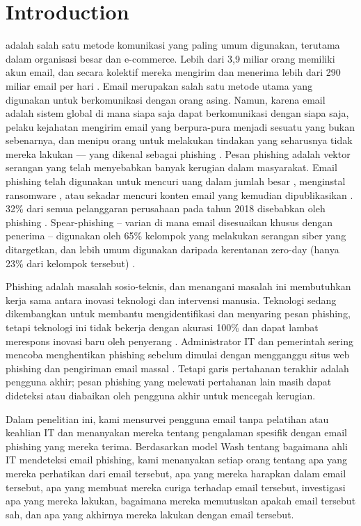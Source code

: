 \documentclass[lettersize,journal]{IEEEtran}
\begin{document}
\section{Introduction}
 adalah salah satu metode komunikasi yang paling umum 
digunakan, terutama dalam organisasi besar dan e-commerce. Lebih dari 3,9 miliar
orang memiliki akun email, dan secara kolektif mereka mengirim dan menerima
lebih dari 290 miliar email per hari \cite{sebelas}. Email merupakan salah 
satu metode utama yang digunakan untuk berkomunikasi dengan orang asing. 
Namun, karena email adalah sistem global di mana siapa saja dapat berkomunikasi 
dengan siapa saja, pelaku kejahatan mengirim email yang berpura-pura menjadi
sesuatu yang bukan sebenarnya, dan menipu orang untuk melakukan tindakan yang
seharusnya tidak mereka lakukan — yang dikenal sebagai phishing \cite{tigaempat}.
Pesan phishing adalah vektor serangan yang telah menyebabkan banyak kerugian
dalam masyarakat. Email phishing telah digunakan untuk mencuri uang dalam jumlah
besar \cite{duadua}, menginstal ransomware \cite{tigasatu}, atau sekadar mencuri
konten email yang kemudian dipublikasikan \cite{duasatu}. 32\% dari semua 
pelanggaran perusahaan pada tahun 2018 disebabkan oleh phishing \cite{tigatiga}. 
Spear-phishing – varian di mana email disesuaikan khusus dengan penerima – digunakan
oleh 65\% kelompok yang melakukan serangan siber yang ditargetkan, dan lebih umum 
digunakan daripada kerentanan zero-day (hanya 23\% dari kelompok tersebut) \cite{tigadua}.

Phishing adalah masalah sosio-teknis, dan menangani masalah ini membutuhkan
kerja sama antara inovasi teknologi dan intervensi manusia. Teknologi sedang
dikembangkan untuk membantu mengidentifikasi dan menyaring pesan phishing,
tetapi teknologi ini tidak bekerja dengan akurasi 100\% dan dapat lambat
merespons inovasi baru oleh penyerang \cite{satuempat}. Administrator IT dan
pemerintah sering mencoba menghentikan phishing sebelum dimulai dengan
mengganggu situs web phishing dan pengiriman email massal \cite{satunol}.
Tetapi garis pertahanan terakhir adalah pengguna akhir; pesan phishing yang
melewati pertahanan lain masih dapat dideteksi atau diabaikan oleh pengguna
akhir untuk mencegah kerugian.

Dalam penelitian ini, kami mensurvei pengguna email tanpa pelatihan atau
keahlian IT dan menanyakan mereka tentang pengalaman spesifik dengan email
phishing yang mereka terima. Berdasarkan model Wash \cite{tigaempat} tentang bagaimana ahli IT
mendeteksi email phishing, kami menanyakan setiap orang tentang apa yang mereka
perhatikan dari email tersebut, apa yang mereka harapkan dalam email tersebut,
apa yang membuat mereka curiga terhadap email tersebut, investigasi apa yang
mereka lakukan, bagaimana mereka memutuskan apakah email tersebut sah, dan apa
yang akhirnya mereka lakukan dengan email tersebut.
\end{document}
